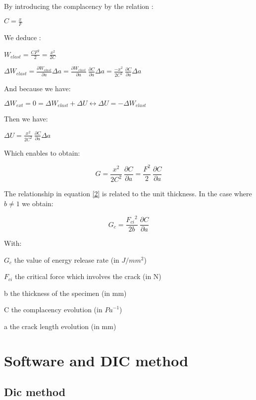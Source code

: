 By introducing the complacency by the relation :

$C=\frac{x}{F}$

We deduce :

$W_{elast}=\frac{CF^2}{2}=\frac{x^2}{2C}$

$\Delta W_{elast}=\frac{\partial W_{elast}}{\partial a}\Delta a=\frac{\partial W_{elast}}{\partial a}\ \frac{\partial C}{\partial a}\Delta a=\frac{-x^2}{2C^2}\ \frac{\partial C}{\partial a}\Delta a$

And because we have:

$\Delta W_{ext}=0=\Delta W_{elast}+\Delta U\leftrightarrow \Delta U =-\Delta W_{elast}$

Then we have:

$\Delta U=\frac{x^2}{2C^2}\ \frac{\partial C}{\partial a}\Delta a$

Which enables to obtain:

\begin{equation}
	G=\frac{x^2}{2C^2}\ \frac{\partial C}{\partial a}=\frac{F^2}{2}\ \frac{\partial C}{\partial a}
	\label{2}
\end{equation}

The relationship in equation \ref{2} is related to the unit thickness. In the case where $b\neq1$
we obtain:

\begin{equation}
	G_c=\frac{{F_{ci}}^2}{2b}\ \frac{\partial C}{\partial a}
	\label{3}
\end{equation}

With:

$G_c$ the value of energy release rate (in $J/mm^2$)

$F_{ci}$ the critical force which involves the crack (in N)

b the thickness of the specimen (in mm)

C the complacency evolution (in ${Pa}^{-1}$)

a the crack length evolution (in mm)



\section{Software and DIC method}

\subsection{Dic method}

